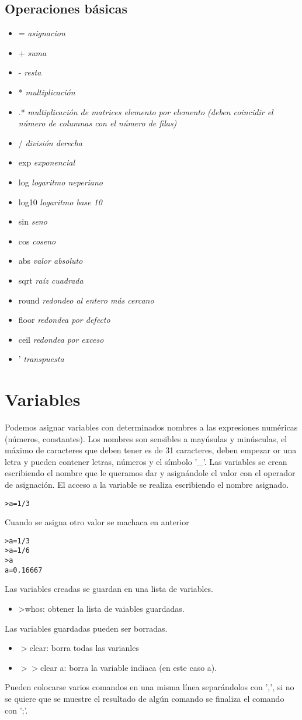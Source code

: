 \documentclass[a4,12pt,graphicx,caption,rotating]{article}
\begin{document}
\subsection{Operaciones básicas}
\begin{itemize}
\item= \emph{asignacion}
\item+ \emph{suma}
\item- \emph{resta}
\item* \emph{multiplicación}
\item.* \emph{multiplicación de matrices elemento por elemento (deben coincidir el número de columnas con el número de filas)}
\item/ \emph{división derecha}
\item exp \emph{exponencial}
\item log \emph{logaritmo neperiano}
\item log10 \emph{logaritmo base 10}
\item sin \emph{seno}
\item cos \emph{coseno}
\item abs \emph{valor absoluto}
\item sqrt \emph{raíz cuadrada}
\item round \emph{redondeo al entero más cercano}
\item floor \emph{redondea por defecto}
\item ceil \emph{redondea por exceso}
\item ' \emph{transpuesta}
\end{itemize}
\section{Variables}
Podemos asignar variables con determinados nombres a las expresiones numéricas (números, constantes). Los nombres son sensibles a mayúsulas y minúsculas, el máximo de caracteres que deben tener es de 31 caracteres, deben empezar or una letra y pueden contener letras, números y el símbolo '\_'. Las variables se crean escribiendo el nombre que le queramos dar y asignándole el valor con el operador de asignación. El acceso a la variable se realiza escribiendo el nombre asignado.
\begin{verbatim}
>a=1/3
\end{verbatim}
Cuando se asigna otro valor se machaca en anterior
\begin{verbatim}
>a=1/3
>a=1/6
>a
a=0.16667
\end{verbatim}
Las variables creadas se guardan en una lista de variables.
\begin{itemize}
\item>whos: obtener la lista de vaiables guardadas.
\end{itemize}
Las variables guardadas pueden ser borradas.
\begin{itemize}
\item$>$clear: borra todas las varianles
\item$>>$clear a: borra la variable indiaca (en este caso a).
\end{itemize}
Pueden colocarse varios comandos en una misma línea separándolos con ',', si no se quiere que se muestre el resultado de algún comando se finaliza el comando con ';'.
\end{document}
